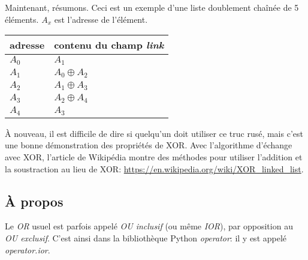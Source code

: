 Maintenant, résumons. Ceci est un exemple d'une liste doublement chaînée de 5 éléments.
$A_x$ est l'adresse de l'élément.

\begin{center}
\begin{tabular}{ | l | l | }
	\hline
	\HeaderColor adresse & \HeaderColor contenu du champ \emph{link} \\
	\hline
	$A_0$ & $A_1$ \\
	\hline
	$A_1$ & $A_0 \oplus A_2$ \\
	\hline
	$A_2$ & $A_1 \oplus A_3$ \\
	\hline
	$A_3$ & $A_2 \oplus A_4$ \\
	\hline
	$A_4$ & $A_3$ \\
	\hline
\end{tabular}
\end{center}

À nouveau, il est difficile de dire si quelqu'un doit utiliser ce truc rusé, mais
c'est une bonne démonstration des propriétés de XOR. Avec l'algorithme d'échange
avec XOR, l'article de Wikipédia montre des méthodes pour utiliser l'addition et
la soustraction au lieu de XOR:
\url{https://en.wikipedia.org/wiki/XOR_linked_list}.

%


\subsection{À propos}

Le \emph{OR} usuel est parfois appelé \emph{OU inclusif} (ou même \emph{IOR}), par opposition
au \emph{OU exclusif}.
C'est ainsi dans la bibliothèque Python \emph{operator}: il y est appelé \emph{operator.ior}.

